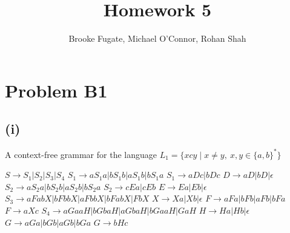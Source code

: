 \documentclass[12pt]{article}
\begin{document}
\pagestyle{plain}
\titleformat{\subsection}[runin]
  {\normalfont\large\bfseries}{\thesubsection}{1em}{}
\titleformat{\subsubsection}[runin]
  {\bfseries}{}{}{}

\title{Homework 5}
\author{Brooke Fugate, Michael O'Connor, Rohan Shah}
\date{}

\maketitle

\section*{Problem B1}
\subsection*{(i)} A context-free grammar for the language
$L_1 = \{xcy \mid x\neq y,\ x,y\in \{a,b\}^*\}$
\begin{center}
\parbox{7cm}{
$S \rightarrow S_1|S_2|S_3|S_4$ \newline
$S_1 \rightarrow aS_1a|bS_1b|aS_1b|bS_1a$ \newline
$S_1 \rightarrow aDc|bDc$ \newline
$D \rightarrow aD|bD| \epsilon$ \newline
$S_2 \rightarrow aS_2a|bS_2b|aS_2b|bS_2a$ \newline
$S_2 \rightarrow cEa|cEb$ \newline
$E \rightarrow Ea|Eb| \epsilon$ \newline
$S_3 \rightarrow aFabX|bFbbX|aFbbX|bFabX|FbX$ \newline
$X \rightarrow Xa|Xb|\epsilon$ \newline
$F \rightarrow aFa|bFb|aFb|bFa$ \newline
$F \rightarrow aXc$ \newline
$S_4 \rightarrow aGaaH|bGbaH|aGbaH|bGaaH|GaH$ \newline
$H \rightarrow Ha|Hb|\epsilon$ \newline
$G \rightarrow aGa|bGb|aGb|bGa$ \newline
$G \rightarrow bHc$
}\end{center}
\end{document}
